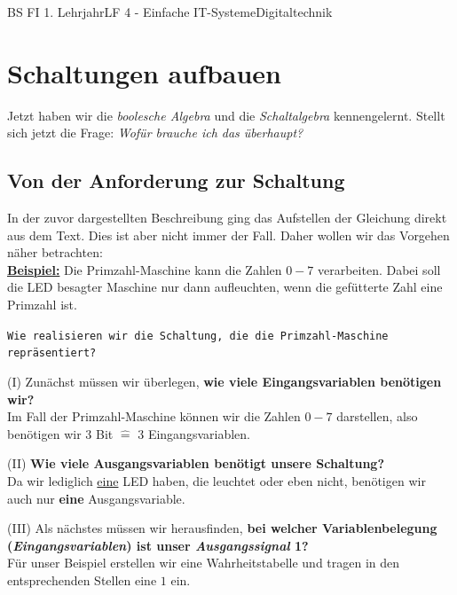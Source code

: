 \documentclass[11pt,twocolumn,oneside,openany,headings=optiontotoc,11pt,numbers=noenddot]{article}
\begin{document}
	\begin{worksheet}{BS FI 1. Lehrjahr}{LF 4 - Einfache IT-Systeme}{Digitaltechnik}
		\setcounter{section}{4}
		\setcounter{page}{13}
		\section{Schaltungen aufbauen}
		Jetzt haben wir die \textit{boolesche Algebra} und die \textit{Schaltalgebra} kennengelernt. Stellt sich jetzt die Frage: \textit{Wofür brauche ich das überhaupt?}
		\par\noindent
		\subsection{Von der Anforderung zur Schaltung}
		In der zuvor dargestellten Beschreibung ging das Aufstellen der Gleichung direkt aus dem Text. Dies ist aber nicht immer der Fall. Daher wollen wir das Vorgehen näher betrachten:\\
		\underline{\textbf{Beispiel:}} Die Primzahl-Maschine kann die Zahlen \(0 - 7\) verarbeiten. Dabei soll die LED besagter Maschine nur dann aufleuchten, wenn die \grq{}gefütterte\grq{} Zahl eine Primzahl ist.\\
		\par\noindent
		\texttt{Wie realisieren wir die Schaltung, die die Primzahl-Maschine repräsentiert?}\\
		\par
		(I) Zunächst müssen wir überlegen, \textbf{wie viele Eingangsvariablen benötigen wir?}\\
		Im Fall der Primzahl-Maschine können wir die Zahlen \(0 - 7\) darstellen, also benötigen wir \(3\) Bit \(\hat{=}\) \(3\) Eingangsvariablen.\\
		\par
		(II) \textbf{Wie viele Ausgangsvariablen benötigt unsere Schaltung?}\\
		Da wir lediglich \underline{eine} LED haben, die leuchtet oder eben nicht, benötigen wir auch nur \textbf{eine} Ausgangsvariable.\\
		\par
		(III) Als nächstes müssen wir herausfinden, \textbf{bei welcher Variablenbelegung (\textit{Eingangsvariablen}) ist unser \textit{Ausgangssignal} 1?}\\
		Für unser Beispiel erstellen wir eine Wahrheitstabelle und tragen in den entsprechenden Stellen eine \(1\) ein.\\
		\par\noindent

\end{worksheet}
\end{document}

